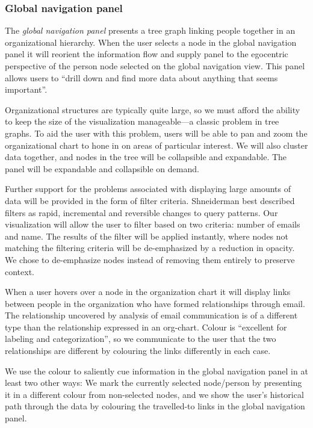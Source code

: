 \documentclass{soups}
\begin{document}
\subsubsection{Global navigation panel}

The \emph{global navigation panel} presents a tree graph linking people together in an organizational hierarchy. When the user selects a node in the global navigation panel it will reorient the information flow and supply panel to the egocentric perspective of the person node selected on the global navigation view. This panel allows users to “drill down and find more data about anything that seems important”\cite{ware2012information}.

Organizational structures are typically quite large, so we must afford the ability to keep the size of the visualization manageable---a classic problem in tree graphs\cite{herman2000graph}.  To aid the user with this problem, users will be able to pan and zoom the organizational chart to hone in on areas of particular interest. We will also cluster data together, and nodes in the tree will be collapsible and expandable. The panel will be expandable and collapsible on demand.

Further support for the problems associated with displaying large amounts of data will be provided in the form of filter criteria. Shneiderman best described filters as rapid, incremental and reversible changes to query patterns\cite{ahlberg1994visual}. Our visualization will allow the user to filter based on two criteria: number of emails and name. The results of the filter will be applied instantly, where nodes not matching the filtering criteria will be de-emphasized by a reduction in opacity. We chose to de-emphasize nodes instead of removing them entirely to preserve context. 

When a user hovers over a node in the organization chart it will display links between people in the organization who have formed relationships through email. The relationship uncovered by analysis of email communication is of a different type than the relationship expressed in an org-chart. Colour is “excellent for labeling and categorization”\cite{ware2012information}, so we communicate to the user that the two relationships are different by colouring the links differently in each case.

We use the colour to saliently cue\cite{ware2012information} information in the global navigation panel in at least two other ways: We mark the currently selected node/person by presenting it in a different colour from non-selected nodes, and we show the user's historical path through the data by colouring the travelled-to links in the global navigation panel.
\end{document}
